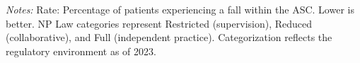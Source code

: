 \begin{table}[htbp]
    \centering
    \caption{Summary of ASC-2: Patient Falls Rate by Authority and Year}
    \label{tab:asc_rate_2}
    \vspace{0.2cm}
    \vspace{0.1cm}
    \begin{minipage}{\textwidth}
        \footnotesize \textit{Notes:} Rate: Percentage of patients experiencing a fall within the ASC. Lower is better. NP Law categories represent Restricted (supervision), Reduced (collaborative), and Full (independent practice). Categorization reflects the regulatory environment as of 2023.
    \end{minipage}
\end{table}
